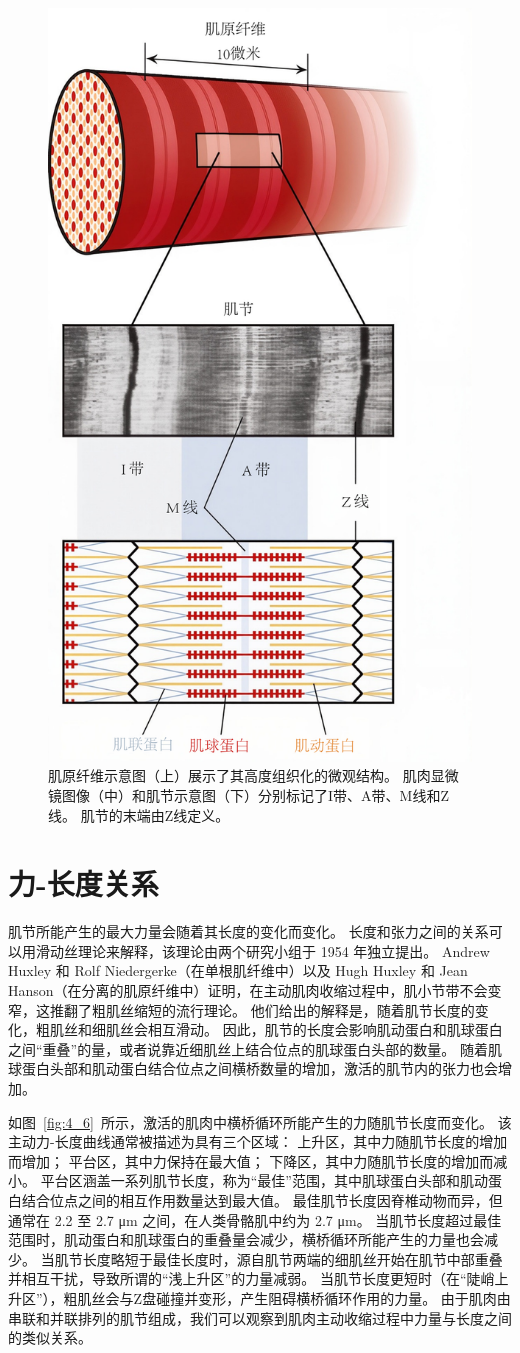 \begin{figure}[!htb]
	\centering
	\includegraphics[width=0.5\linewidth]{chap4/4_5}
	\caption{肌原纤维示意图（上）展示了其高度组织化的微观结构。
		肌肉显微镜图像（中）和肌节示意图（下）分别标记了I带、A带、M线和Z线。
		肌节的末端由Z线定义。 \label{fig:4_5}}
\end{figure}


\section{力-长度关系}

肌节所能产生的最大力量会随着其长度的变化而变化。
长度和张力之间的关系可以用滑动丝理论来解释，该理论由两个研究小组于 1954 年独立提出。
Andrew Huxley 和 Rolf Niedergerke（在单根肌纤维中）以及 Hugh Huxley 和 Jean Hanson（在分离的肌原纤维中）证明，在主动肌肉收缩过程中，肌小节带不会变窄，这推翻了粗肌丝缩短的流行理论。
他们给出的解释是，随着肌节长度的变化，粗肌丝和细肌丝会相互滑动。
因此，肌节的长度会影响肌动蛋白和肌球蛋白之间“重叠”的量，或者说靠近细肌丝上结合位点的肌球蛋白头部的数量。
随着肌球蛋白头部和肌动蛋白结合位点之间横桥数量的增加，激活的肌节内的张力也会增加。


如图~\ref{fig:4_6}~所示，激活的肌肉中横桥循环所能产生的力随肌节长度而变化。
该主动力-长度曲线通常被描述为具有三个区域：
上升区，其中力随肌节长度的增加而增加；
平台区，其中力保持在最大值；
下降区，其中力随肌节长度的增加而减小。
平台区涵盖一系列肌节长度，称为“最佳”范围，其中肌球蛋白头部和肌动蛋白结合位点之间的相互作用数量达到最大值。
最佳肌节长度因脊椎动物而异，但通常在 2.2 至 2.7 μm 之间，在人类骨骼肌中约为 2.7 μm。
当肌节长度超过最佳范围时，肌动蛋白和肌球蛋白的重叠量会减少，横桥循环所能产生的力量也会减少。
当肌节长度略短于最佳长度时，源自肌节两端的细肌丝开始在肌节中部重叠并相互干扰，导致所谓的“浅上升区”的力量减弱。
当肌节长度更短时（在“陡峭上升区”），粗肌丝会与Z盘碰撞并变形，产生阻碍横桥循环作用的力量。
由于肌肉由串联和并联排列的肌节组成，我们可以观察到肌肉主动收缩过程中力量与长度之间的类似关系。

